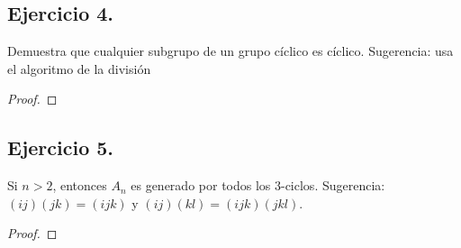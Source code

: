 \documentclass[11pt,letterpaper]{article}
\begin{document}
\subsection*{Ejercicio 4.}
Demuestra que cualquier subgrupo de un grupo cíclico es cíclico. Sugerencia: usa el algoritmo
de la división
\begin{proof}
    
\end{proof}

\subsection*{Ejercicio 5.}
Si $n > 2$, entonces $A_n$ es generado por todos los 3-ciclos. Sugerencia:
$(ij)(jk) = (ijk)$ y $(ij)(kl) = (ijk)(jkl)$.
\begin{proof}
    
\end{proof}




\end{document}
